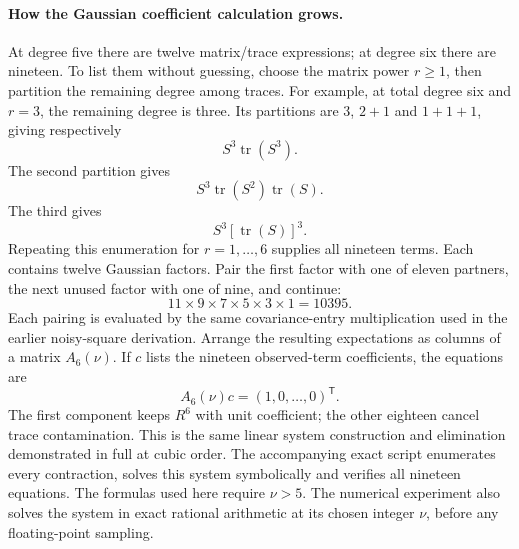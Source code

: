 \documentclass[11pt]{article}
\begin{document}
\paragraph{How the Gaussian coefficient calculation grows.}
At degree five there are twelve matrix/trace expressions; at degree six
there are nineteen. To list them without guessing, choose the matrix
power $r\geq1$, then partition the remaining degree among traces. For
example, at total degree six and $r=3$, the remaining degree is three.
Its partitions are $3$, $2+1$ and $1+1+1$, giving respectively
\begin{equation}
 S^3\operatorname{tr}(S^3).
\end{equation}
The second partition gives
\begin{equation}
 S^3\operatorname{tr}(S^2)\operatorname{tr}(S).
\end{equation}
The third gives
\begin{equation}
 S^3[\operatorname{tr}(S)]^3.
\end{equation}
Repeating this enumeration for $r=1,\ldots,6$ supplies all nineteen terms.
Each contains twelve Gaussian factors. Pair the first factor with one
of eleven partners, the next unused factor with one of nine, and continue:
\begin{equation}
 11\times9\times7\times5\times3\times1=10395.
\end{equation}
Each pairing is evaluated by the same covariance-entry multiplication
used in the earlier noisy-square derivation. Arrange the resulting
expectations as columns of a matrix $A_6(\nu)$. If $c$ lists the nineteen
observed-term coefficients, the equations are
\begin{equation}
 A_6(\nu)c=(1,0,\ldots,0)^{\mathsf T}.
\end{equation}
The first component keeps $R^6$ with unit coefficient; the other eighteen
cancel trace contamination. This is the same linear system construction
and elimination demonstrated in full at cubic order. The accompanying
exact script enumerates every contraction, solves this system symbolically
and verifies all nineteen equations. The formulas used here require
$\nu>5$. The numerical experiment also solves the system in exact rational
arithmetic at its chosen integer $\nu$, before any floating-point sampling.
\end{document}

